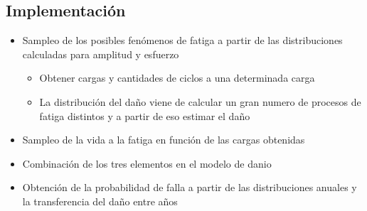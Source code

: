 \documentclass[11pt]{article}
\begin{document}
\subsection{Implementación}
\label{sec:org0ea036e}
\begin{itemize}
\item Sampleo de los posibles fenómenos de fatiga a partir de las distribuciones calculadas para amplitud y esfuerzo
\begin{itemize}
\item Obtener cargas y cantidades de ciclos a una determinada carga
\item La distribución del daño viene de calcular un gran numero de procesos de fatiga distintos y a partir de eso estimar el daño
\end{itemize}
\item Sampleo de la vida a la fatiga en función de las cargas obtenidas
\item Combinación de los tres elementos en el modelo de danio
\item Obtención de la probabilidad de falla a partir de las distribuciones anuales y la transferencia del daño entre años
\end{itemize}
\end{document}
